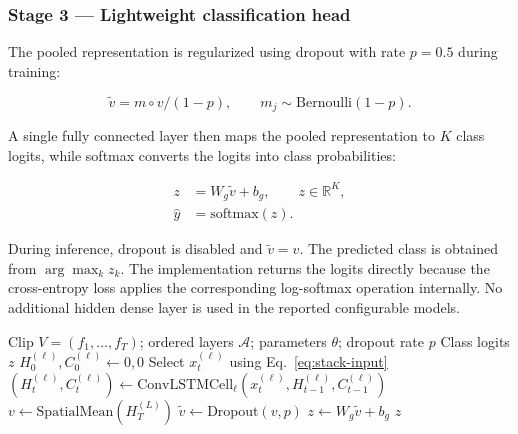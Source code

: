 \documentclass[journal,article,submit,moreauthors]{Definitions/mdpi}
\newcommand{\R}{\mathbb{R}}
\begin{document}
    \subsubsection{Stage 3 --- Lightweight classification head}

    The pooled representation is regularized using dropout with 
    rate $p=0.5$ during training:

    \begin{equation}
        \tilde{v} = m\circ v/(1-p), \qquad
        m_j\sim\mathrm{Bernoulli}(1-p).
        \label{eq:dropout1}
    \end{equation}

    A single fully connected layer then maps the pooled 
    representation to $K$ class logits, while softmax converts 
    the logits into class probabilities:

    \begin{align}
        z &= W_g\tilde{v}+b_g, \qquad z\in\R^K, \label{eq:fc1}\\
        \hat{y} &= \mathrm{softmax}(z). \label{eq:softmax}
    \end{align}

    During inference, dropout is disabled and $\tilde{v}=v$. The 
    predicted class is obtained from $\arg\max_k z_k$. The 
    implementation returns the logits directly because the 
    cross-entropy loss applies the corresponding log-softmax 
    operation internally. No additional hidden dense layer is 
    used in the reported configurable models.

    \begin{algorithm}[htbp]
        \caption{Reconfigurable ConvLSTM Forward Pass}
        \label{alg:convlstm}
        \begin{algorithmic}[1]
            \Require Clip $V=(f_1,\ldots,f_T)$; ordered layers 
            $\mathcal{A}$;
            parameters $\theta$; dropout rate $p$
            \Ensure Class logits $z$
                \State $H_0^{(\ell)},C_0^{(\ell)}\gets 0,0$
                    \State Select $x_t^{(\ell)}$ using 
                    Eq.~\eqref{eq:stack-input}
                    \State $(H_t^{(\ell)},C_t^{(\ell)})\gets
                        \mathrm{ConvLSTMCell}_{\ell}
                        (x_t^{(\ell)},H_{t-1}^{(\ell)},C_{t-1}^{(\ell)})$
                \EndFor
            \EndFor
            \State $v\gets\mathrm{SpatialMean}(H_T^{(L)})$
            \State $\tilde{v}\gets\mathrm{Dropout}(v,p)$
            \State $z\gets W_g\tilde{v}+b_g$
            \State \Return $z$
        \end{algorithmic}
    \end{algorithm}
\end{document}

